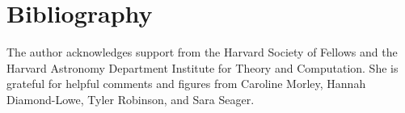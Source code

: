 \documentclass[graybox,natbib,nosecnum]{svmult}
\begin{document}
\section{Bibliography}

\begin{acknowledgement}
The author acknowledges support from the Harvard Society of Fellows and the Harvard Astronomy Department Institute for Theory and Computation. She is grateful for helpful comments and figures from Caroline Morley, Hannah Diamond-Lowe, Tyler Robinson, and Sara Seager.
\end{acknowledgement}

\end{document}
